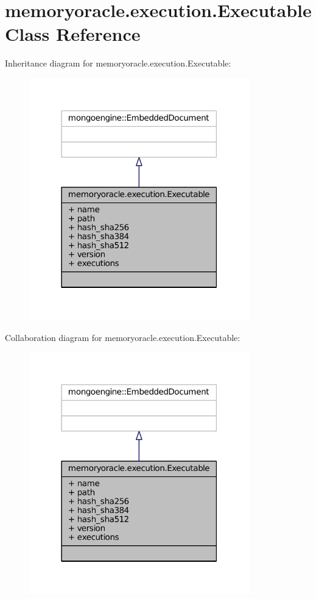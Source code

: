 \hypertarget{classmemoryoracle_1_1execution_1_1Executable}{}\section{memoryoracle.\+execution.\+Executable Class Reference}
\label{classmemoryoracle_1_1execution_1_1Executable}


Inheritance diagram for memoryoracle.\+execution.\+Executable\+:\nopagebreak
\begin{figure}[H]
\begin{center}
\leavevmode
\includegraphics[width=271pt]{classmemoryoracle_1_1execution_1_1Executable__inherit__graph}
\end{center}
\end{figure}


Collaboration diagram for memoryoracle.\+execution.\+Executable\+:\nopagebreak
\begin{figure}[H]
\begin{center}
\leavevmode
\includegraphics[width=271pt]{classmemoryoracle_1_1execution_1_1Executable__coll__graph}
\end{center}
\end{figure}
